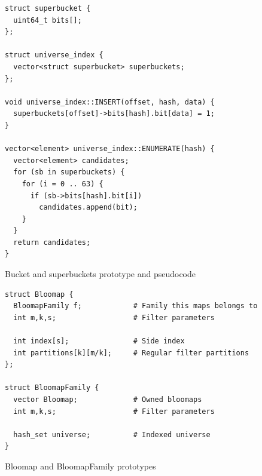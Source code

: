\begin{figure}[h!]
\begin{tcolorbox}
\begin{verbatim}
struct superbucket {
  uint64_t bits[];
};

struct universe_index {
  vector<struct superbucket> superbuckets;
};

void universe_index::INSERT(offset, hash, data) {
  superbuckets[offset]->bits[hash].bit[data] = 1;
}

vector<element> universe_index::ENUMERATE(hash) {
  vector<element> candidates;
  for (sb in superbuckets) {
    for (i = 0 .. 63) {
      if (sb->bits[hash].bit[i]) 
        candidates.append(bit);
    }
  }
  return candidates;
}
\end{verbatim}
\end{tcolorbox}
\caption{Bucket and superbuckets prototype and pseudocode}
	\label{figure-bucketshop-pseudocode}
\end{figure}

\begin{figure}[!ht]
\begin{tcolorbox}
\begin{verbatim}
struct Bloomap {
  BloomapFamily f;            # Family this maps belongs to
  int m,k,s;                  # Filter parameters

  int index[s];               # Side index
  int partitions[k][m/k];     # Regular filter partitions
};

struct BloomapFamily {
  vector Bloomap;             # Owned bloomaps
  int m,k,s;                  # Filter parameters

  hash_set universe;          # Indexed universe
}
\end{verbatim}
\end{tcolorbox}
\caption{Bloomap and BloomapFamily prototypes}
\label{figure-bloomap-decl}
\end{figure}

